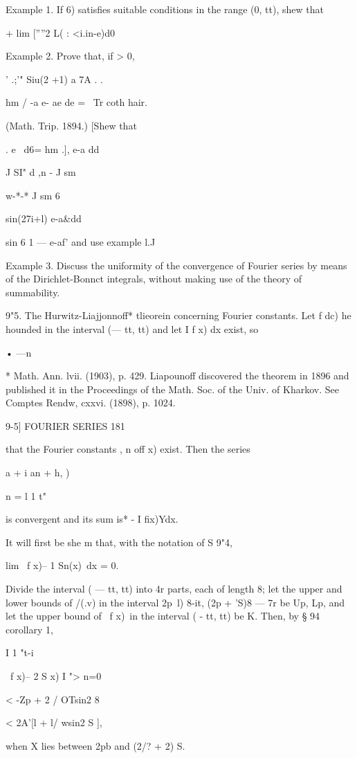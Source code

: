 Example 1. If 6) satisfies suitable conditions in the range (0, tt),
shew that

+ lim [''''2 L( : <i.in-e)d0

Example 2. Prove that, if > 0,

' .;'" Siu(2 +1) a 7A . .

hm / -a e- ae de = \ Tr coth hair.

(Math. Trip. 1894.) [Shew that

  . e~ d6= hm .], e-a dd

J SI" d ,n - J sm

w-*-* J sm 6

  sin(27i+l) e-a\&dd

sin 6 1 — e-af' and use example l.J

Example 3. Discuss the uniformity of the convergence of Fourier series
by means of the Dirichlet-Bonnct integrals, without making use of the
theory of summability.

9"5. The Hurwitz-Liajjonnoff* tlieorein concerning Fourier constants.
Let f dc) he hounded in the interval (— tt, tt) and let I f x) dx
exist, so

• —n

* Math. Ann. lvii. (1903), p. 429. Liapounoff discovered the theorem
in 1896 and published it in the Proceedings of the Math. Soc. of the
Univ. of Kharkov. See Comptes Rendw, cxxvi. (1898), p. 1024.

9-5] FOURIER SERIES 181

that the Fourier constants , n off x) exist. Then the series

 a + i an + h, )

n = l 1 t"

is convergent and its sum is* - I fix)Ydx.

It will first be she m that, with the notation of S 9"4,

lim \ f x)-- 1 Sn(x)\ dx = 0.

Divide the interval ( — tt, tt) into 4r parts, each of length 8; let
the upper and lower bounds of /(.v) in the interval 2p~l) 8-it, (2p +
'S)8 — 7r be Up, Lp, and let the upper bound of \ f x)\ in the
interval ( - tt, tt) be K. Then, by § 94 corollary 1,

I 1 "t-i

\ f x)-- 2 S x) I "> n=0

< -Zp + 2 / OTsin2 8

< 2A'[l + l/ wsin2 S ],

when X lies between 2pb and (2/? + 2) S.

